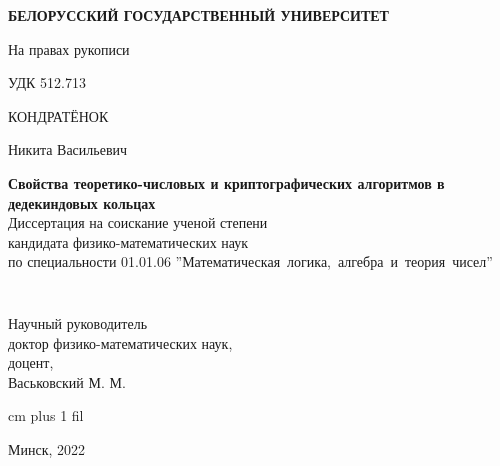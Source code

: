 \thispagestyle{empty}
\normalsize
\begin{center}
{\fontsize{16}{16}\selectfont \textbf{БЕЛОРУССКИЙ ГОСУДАРСТВЕННЫЙ УНИВЕРСИТЕТ}}
\end{center}
\vspace{4ex}
\normalsize

\noindent На правах рукописи\par
\noindent УДК 512.713 %

\normalsize
\begin{center}
\vspace{6ex}
{\fontsize{16}{16}\selectfont КОНДРАТЁНОК}

{\fontsize{16}{16}\selectfont Никита Васильевич}
\end{center}
\vspace{0ex}
\begin{center}
\large
\textbf{Свойства теоретико-числовых и криптографических алгоритмов в дедекиндовых кольцах}\\
\vspace{4ex}
{\fontsize{15}{15}\selectfont Диссертация на соискание ученой степени}\\
{\fontsize{15}{15}\selectfont кандидата физико-математических наук}\\
\vspace{2ex}
{\fontsize{15}{15}\selectfont по специальности 01.01.06 ''Математическая~логика,~алгебра~и~теория~чисел''}
\vspace{2ex}
\end{center}


\normalsize
\vspace{3ex}
\begin{minipage}{0.4\textwidth}
  \begin{flushleft}
$\,$\\
$\,$\\
$\,$\\
$\,$\\
\end{flushleft}
\end{minipage}
$\quad$
\begin{minipage}{0.6\textwidth}
  \begin{flushleft}
Научный руководитель\\
доктор физико-математических наук,\\
доцент,\\
Васьковский М. М.\\
  \end{flushleft}
\end{minipage}


 cm plus 1 fil
\begin{center}
Минск, 2022
\end{center}
\eject
